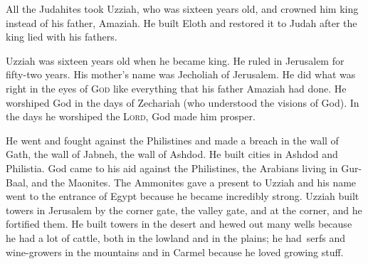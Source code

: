 
\begin{inparaenum}
     All the Judahites took Uzziah, who was sixteen years old, and crowned him king instead of his father, Amaziah.%
     He built Eloth and restored it to Judah after the king lied with his fathers.%
    
     Uzziah was sixteen years old when he became king. He ruled in Jerusalem for fifty-two years. His mother's name was Jecholiah of Jerusalem.%
     He did what was right in the eyes of \textsc{God} like everything that his father Amaziah had done.%
     He worshiped God in the days of Zechariah (who understood the visions of God). In the days he worshiped the \textsc{Lord}, God made him prosper.%
    
     He went and fought against the Philistines and made a breach in the wall of Gath, the wall of Jabneh, the wall of Ashdod. He built cities in Ashdod and Philistia.%
     God came to his aid against the Philistines, the Arabians living in Gur-Baal, and the Maonites.%
     The Ammonites gave a present to Uzziah and his name went to the entrance of Egypt because he became incredibly strong.%
     Uzziah built towers in Jerusalem by the corner gate, the valley gate, and at the corner, and he fortified them.%
     He built towers in the desert and hewed out many wells because he had a lot of cattle, both in the lowland and in the plains; he had\understood\ serfs and wine-growers in the mountains and in Carmel because he loved growing stuff.%
    

\end{inparaenum}
